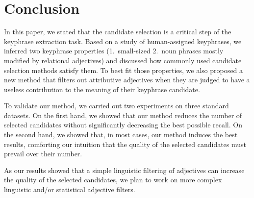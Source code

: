 \section{Conclusion}
\label{sec:conclusion}
  In this paper, we stated that the candidate selection is a critical step of
  the keyphrase extraction task. Based on a study of human-assigned keyphrases,
  we inferred two keyphrase properties (1.~small-sized 2.~noun phrases mostly
  modified by relational adjectives) and
  discussed how commonly used candidate selection methods satisfy them. To best
  fit those properties, we also proposed a new method that filters out
  attributive adjectives when they are judged to have a useless contribution to
  the meaning of their keyphrase candidate.

  To validate our method, we carried out two experiments on three standard
  datasets. On the first hand, we showed that our method reduces the number of
  selected candidates without significantly decreasing the best possible recall.
  On the second hand, we showed that, in most cases, our method induces the best
  results, comforting our intuition that the quality of the selected candidates
  must prevail over their number.

  As our results showed that a simple linguistic filtering of adjectives can
  increase the quality of the selected candidates, we plan to work on more
  complex linguistic and/or statistical adjective filters.

